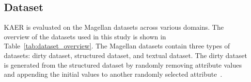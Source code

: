 \subsection{Dataset}

KAER is evaluated on the Magellan datasets \cite{magellandata} across various domains. 
The overview of the datasets used in this study is shown in Table~\ref{tab:dataset_overview}. 
The Magellan datasets contain three types of datasets: dirty dataset, structured dataset, and textual dataset.
The dirty dataset is generated from the structured dataset by randomly removing attribute values and appending the initial values to another randomly selected attribute~\cite{li_deep_2020}.

\begin{table}[h]
\centering
{}
\caption{Dataset Summary}
\label{tab:dataset_overview}
\vspace{-0.5cm}
\end{table}

